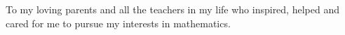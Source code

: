 To my loving parents and all the teachers in my life who inspired, helped and cared for me to pursue my interests in mathematics.  